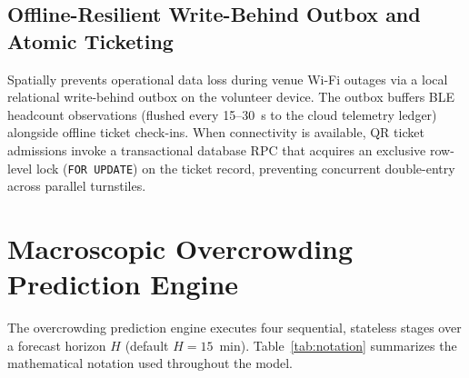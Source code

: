 \documentclass[conference,a4paper]{IEEEtran}
\begin{document}
\subsection{Offline-Resilient Write-Behind Outbox and Atomic Ticketing}
Spatially prevents operational data loss during venue Wi-Fi outages via a local relational write-behind outbox on the volunteer device. The outbox buffers BLE headcount observations (flushed every 15--30~s to the cloud telemetry ledger) alongside offline ticket check-ins. When connectivity is available, QR ticket admissions invoke a transactional database RPC that acquires an exclusive row-level lock (\texttt{FOR UPDATE}) on the ticket record, preventing concurrent double-entry across parallel turnstiles.

\section{Macroscopic Overcrowding Prediction Engine}
\label{sec:pred}
The overcrowding prediction engine executes four sequential, stateless stages over a forecast horizon $H$ (default $H=15$~min). Table~\ref{tab:notation} summarizes the mathematical notation used throughout the model.
\end{document}
